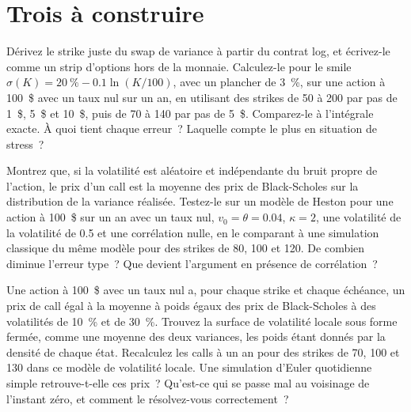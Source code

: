 \section{Trois à construire}

\begin{question}\label{iq:iv2:vol-surface-and-vol-trading:38}
Dérivez le strike juste du swap de variance à partir du contrat log, et écrivez-le comme un strip d'options hors de la monnaie. Calculez-le pour le smile $\sigma(K) = 20~\% - 0.1\ln(K/100)$, avec un plancher de 3~\%, sur une action à 100~\$ avec un taux nul sur un an, en utilisant des strikes de 50 à 200 par pas de 1~\$, 5~\$ et 10~\$, puis de 70 à 140 par pas de 5~\$. Comparez-le à l'intégrale exacte. À quoi tient chaque erreur~? Laquelle compte le plus en situation de stress~?
\end{question}

\begin{question}\label{iq:iv2:vol-surface-and-vol-trading:39}
Montrez que, si la volatilité est aléatoire et indépendante du bruit propre de l'action, le prix d'un call est la moyenne des prix de Black-Scholes sur la distribution de la variance réalisée. Testez-le sur un modèle de Heston pour une action à 100~\$ sur un an avec un taux nul, $v_0 = \theta = 0.04$, $\kappa = 2$, une volatilité de la volatilité de 0.5 et une corrélation nulle, en le comparant à une simulation classique du même modèle pour des strikes de 80, 100 et 120. De combien diminue l'erreur type~? Que devient l'argument en présence de corrélation~?
\end{question}

\begin{question}\label{iq:iv2:vol-surface-and-vol-trading:40}
Une action à 100~\$ avec un taux nul a, pour chaque strike et chaque échéance, un prix de call égal à la moyenne à poids égaux des prix de Black-Scholes à des volatilités de 10~\% et de 30~\%. Trouvez la surface de volatilité locale sous forme fermée, comme une moyenne des deux variances, les poids étant donnés par la densité de chaque état. Recalculez les calls à un an pour des strikes de 70, 100 et 130 dans ce modèle de volatilité locale. Une simulation d'Euler quotidienne simple retrouve-t-elle ces prix~? Qu'est-ce qui se passe mal au voisinage de l'instant zéro, et comment le résolvez-vous correctement~?
\end{question}
